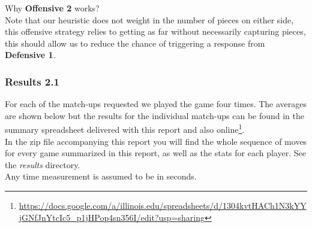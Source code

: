 \documentclass[11pt]{article}
\begin{document}
Why \textbf{Offensive 2} works?\\
Note that our heuristic does not weight in the number of pieces on either side, this offensive strategy relies to getting as far without necessarily capturing pieces, this should allow us to reduce the chance of triggering a response from \textbf{Defensive 1}.\\

\subsubsection*{Results 2.1}
For each of the match-ups requested we played the game four times. The averages are shown below but the results for the individual match-ups can be found in the summary spreadsheet delivered with this report and also online\footnote{\url{https://docs.google.com/a/illinois.edu/spreadsheets/d/1304kvtHACh1N3kYYjGNfJnYtcIc5_p1jHPop4sn356I/edit?usp=sharing}}.\\
In the zip file accompanying this report you will find the whole sequence of moves for every game summarized in this report, as well as the stats for each player. See the \textit{results} directory.\\
Any time measurement is assumed to be in seconds.\\
\end{document}
